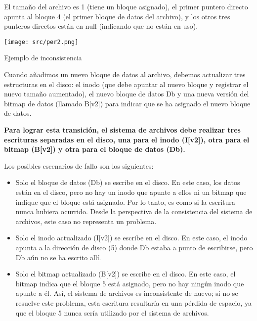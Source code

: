 \documentclass[openany]{book}
\begin{document}
El tamaño del archivo es 1 (\colorbox{blue!20}{tiene un bloque asignado}), el primer puntero directo apunta al \colorbox{blue!20}{bloque 4} (el \colorbox{blue!20}{primer bloque} de datos del archivo), y los \colorbox{blue!20}{otros tres} punteros directos están en null (indicando que \colorbox{blue!20}{no están en uso}). 

\begin{floatingfigure}[r]{0.6\textwidth}
    \texttt{[image: src/per2.png]}
    \caption{Ejemplo de inconsistencia}
\end{floatingfigure}

Cuando añadimos un nuevo bloque de datos al archivo, debemos actualizar tres estructuras en el disco: \colorbox{blue!20}{el inodo} (que debe apuntar al nuevo bloque y registrar el nuevo tamaño aumentado), el \colorbox{blue!20}{nuevo bloque} de datos Db y una nueva versión del \colorbox{blue!20}{bitmap} de datos (llamado B[v2]) para indicar que se ha asignado el nuevo bloque de datos.

\textbf{Para lograr esta transición, el sistema de archivos debe realizar tres escrituras separadas en el disco, una para el inodo (I[v2]), otra para el bitmap (B[v2]) y otra para el bloque de datos (Db). }

Los posibles escenarios de fallo son los siguientes:

\begin{itemize}
    \item \colorbox{blue!20}{Solo el bloque de datos (Db) se escribe en el disco}. En este caso, los datos están en el disco, pero no hay un inodo que apunte a ellos ni un bitmap que indique que el bloque está asignado. Por lo tanto, es como si la escritura nunca hubiera ocurrido. Desde la perspectiva de la consistencia del sistema de archivos, este caso no representa un problema.
    \item \colorbox{blue!20}{Solo el inodo actualizado (I[v2]) se escribe en el disco}. En este caso, el inodo apunta a la dirección de disco (5) donde Db estaba a punto de escribirse, pero Db aún no se ha escrito allí.
    \item \colorbox{blue!20}{Solo el bitmap actualizado (B[v2]) se escribe en el disco}. En este caso, el bitmap indica que el bloque 5 está asignado, pero no hay ningún inodo que apunte a él. Así, el sistema de archivos es inconsistente de nuevo; si no se resuelve este problema, esta escritura resultaría en una pérdida de espacio, ya que el bloque 5 nunca sería utilizado por el sistema de archivos.
\end{itemize}
\end{document}
